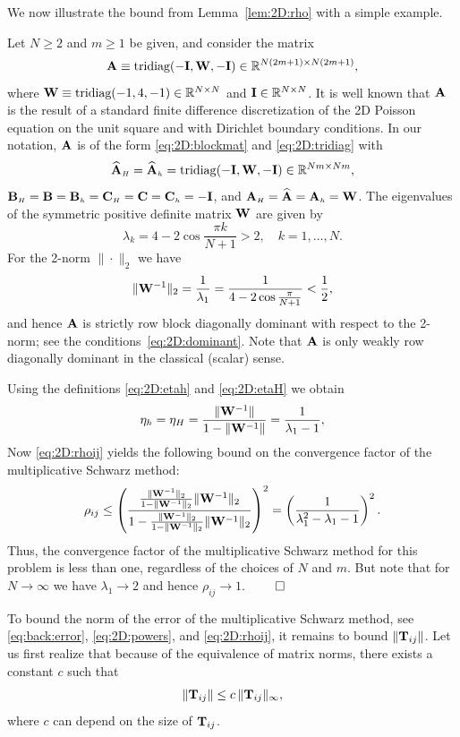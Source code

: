 We now illustrate the bound from Lemma~\ref{lem:2D:rho} with a simple example.

\begin{example}{\textrm
Let $N\geq 2$ and $m\geq 1$ be given, and consider the matrix
%
\[
\mathbf{A}\equiv \textnormal{tridiag}(-\mathbf{I},\mathbf{W},-\mathbf{I})\in\mathbb{R}^{N(2m+1)\times N(2m+1)},
\]
%
where $\mathbf{W}\equiv \textnormal{tridiag}(-1,4,-1)\in {\mathbb R}^{N\times N}$ and
$\mathbf{I}\in {\mathbb R}^{N\times N}$. It is well known that $\mathbf{A}$ is the result
of a standard finite difference discretization of the 2D Poisson equation on
the unit square and with Dirichlet boundary conditions. In our notation,
$\mathbf{A}$ is of the form \eqref{eq:2D:blockmat} and \eqref{eq:2D:tridiag} with
%
\[
\widehat{\mathbf{A}}_{\scriptscriptstyle H}=\widehat{\mathbf{A}}_{\scriptscriptstyle h}=\mathrm{tridiag}(-\mathbf{I},\mathbf{W},-\mathbf{I}) \in{\mathbb R}^{Nm\times Nm},
\]
%
$\mathbf{B}_{\scriptscriptstyle H}=\mathbf{B}=\mathbf{B}_{\scriptscriptstyle h}=\mathbf{C}_{\scriptscriptstyle H}=\mathbf{C}=\mathbf{C}_{\scriptscriptstyle h}=-\mathbf{I}$, and $\mathbf{A}_{\scriptscriptstyle H}=\widehat{\mathbf{A}}=\mathbf{A}_{\scriptscriptstyle h}=\mathbf{W}$.
The eigenvalues of the symmetric positive definite matrix $\mathbf{W}$ are given by
%
\[
\lambda_k=4-2\cos\frac{\pi k}{N+1} > 2,\quad k=1,\dots,N.
\]
%
For the 2-norm $\|\cdot\|_{2}$ we have
\[
    \|\mathbf{W}^{-1}\|_2=\frac{1}{\lambda_1} = \frac{1}{4-2\cos\frac{\pi}{N+1}}
     <\frac{1}{2},
\]
and hence $\mathbf{A}$ is strictly row block diagonally dominant with
respect to the 2-norm; see the conditions~\eqref{eq:2D:dominant}. Note that
$\mathbf{A}$ is only weakly row diagonally dominant in the classical (scalar)
sense.

Using the definitions \eqref{eq:2D:etah} and \eqref{eq:2D:etaH} we obtain
%
\[
    \eta_h=\eta_H=\frac{\| \mathbf{W}^{-1} \| }{1-\| \mathbf{W}^{-1} \|}=\frac{1}{\lambda_1-1},
\]
%
Now \eqref{eq:2D:rhoij} yields the following bound on the convergence factor of
the multiplicative Schwarz method:
%
\[
\rho_{ij}\leq
\left(\frac{\frac{\| \mathbf{W}^{-1} \|_2 }{1-\| \mathbf{W}^{-1} \|_2} \|\mathbf{W}^{-1}\|_2}{1-\frac{\| \mathbf{W}^{-1} \|_2 }{1-\| \mathbf{W}^{-1} \|_2} \|\mathbf{W}^{-1}\|_2}\right)^2 =
\left(\frac{1}{\lambda_1^2-\lambda_1-1}\right)^2.
\]
%
Thus, the convergence factor of the multiplicative Schwarz method for this
problem is less than one, regardless of the choices of $N$ and $m$. But note
that for $N\rightarrow \infty$ we have $\lambda_1\rightarrow 2$ and hence
$\rho_{ij}\rightarrow 1$. \hfill $\qed$
}\end{example}

To bound the norm of the error of the multiplicative Schwarz method, see
\eqref{eq:back:error}, \eqref{eq:2D:powers}, and \eqref{eq:2D:rhoij}, it
remains to bound $\|\mathbf{T}_{ij}\|$. Let us first realize that because of the
equivalence of matrix norms, there exists a constant $c$ such that
$$
   \|\mathbf{T}_{ij}\| \leq c\, \|\mathbf{T}_{ij}\|_\infty,
$$
where $c$ can depend on the size of $\mathbf{T}_{ij}$.

